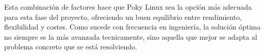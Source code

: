     Esta combinación de factores hace que Poky Linux sea la opción más adecuada para esta fase del proyecto, ofreciendo un buen equilibrio entre rendimiento, flexibilidad y costes. Como sucede con frecuencia en ingeniería, la solución óptima no siempre es la más avanzada tecnicamente, sino aquella que mejor se adapta al problema concreto que se está resolviendo.

